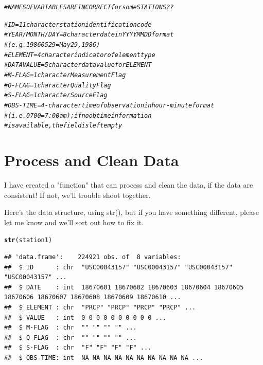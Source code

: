 \documentclass{article}\usepackage[]{graphicx}\usepackage[]{xcolor}
\makeatletter
\newcommand{\hlcom}[1]{\textcolor[rgb]{0.678,0.584,0.686}{\textit{#1}}}%
\newcommand{\hlstd}[1]{\textcolor[rgb]{0.345,0.345,0.345}{#1}}%
\newcommand{\hlkwd}[1]{\textcolor[rgb]{0.737,0.353,0.396}{\textbf{#1}}}%
\newenvironment{kframe}{%
 \def\at@end@of@kframe{}%
 \ifinner\ifhmode%
  \def\at@end@of@kframe{\end{minipage}}%
  \begin{minipage}{\columnwidth}%
 \fi\fi%
 \def\FrameCommand##1{\hskip\@totalleftmargin \hskip-\fboxsep
 \colorbox{shadecolor}{##1}\hskip-\fboxsep
     \hskip-\linewidth \hskip-\@totalleftmargin \hskip\columnwidth}%
 \MakeFramed {\advance\hsize-\width
   \@totalleftmargin\z@ \linewidth\hsize
   \@setminipage}}%
 {\par\unskip\endMakeFramed%
 \at@end@of@kframe}
\newenvironment{knitrout}{}{} %
\makeatother
\begin{document}
\begin{knitrout}
\begin{kframe}
\begin{alltt}
\hlcom{# NAMES OF VARIABLES ARE INCORRECT for some STATIONS??}

  \hlcom{#ID = 11 character station identification code}
  \hlcom{#YEAR/MONTH/DAY = 8 character date in YYYYMMDD format }
  \hlcom{#                     (e.g. 19860529 = May 29, 1986)}
  \hlcom{#ELEMENT = 4 character indicator of element type }
  \hlcom{#DATA VALUE = 5 character data value for ELEMENT }
  \hlcom{#M-FLAG = 1 character Measurement Flag }
  \hlcom{#Q-FLAG = 1 character Quality Flag }
  \hlcom{#S-FLAG = 1 character Source Flag }
  \hlcom{#OBS-TIME = 4-character time of observation in hour-minute format}
  \hlcom{#                     (i.e. 0700 =7:00 am); if no ob time information }
 \hlcom{#is available, the field is left empty}
\end{alltt}
\end{kframe}
\end{knitrout}

\section{Process and Clean Data}


I have created a "function" that can process and clean the data, if the data are consistent!  If not, we'll trouble shoot together. 

Here's the data structure, using str(), but if you have something different, please let me know and we'll sort out how to fix it. 

\begin{knitrout}
\color{fgcolor}\begin{kframe}
\begin{alltt}
\hlkwd{str}\hlstd{(station1)}
\end{alltt}
\begin{verbatim}
## 'data.frame':	224921 obs. of  8 variables:
##  $ ID      : chr  "USC00043157" "USC00043157" "USC00043157" "USC00043157" ...
##  $ DATE    : int  18670601 18670602 18670603 18670604 18670605 18670606 18670607 18670608 18670609 18670610 ...
##  $ ELEMENT : chr  "PRCP" "PRCP" "PRCP" "PRCP" ...
##  $ VALUE   : int  0 0 0 0 0 0 0 0 0 0 ...
##  $ M-FLAG  : chr  "" "" "" "" ...
##  $ Q-FLAG  : chr  "" "" "" "" ...
##  $ S-FLAG  : chr  "F" "F" "F" "F" ...
##  $ OBS-TIME: int  NA NA NA NA NA NA NA NA NA NA ...
\end{verbatim}
\end{kframe}
\end{knitrout}
\end{document}
